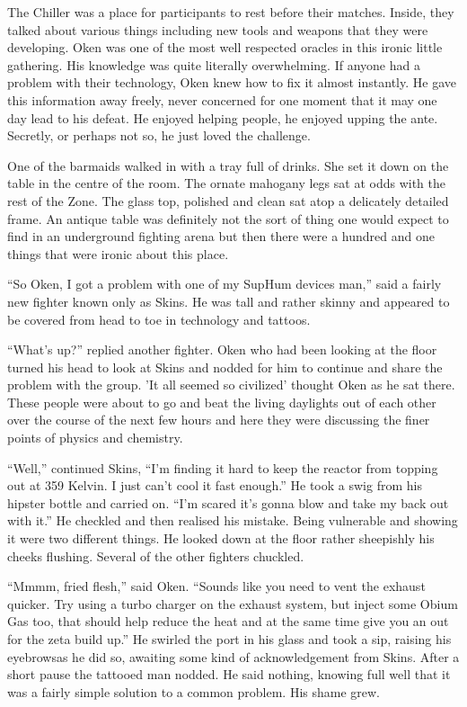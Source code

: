 The Chiller was a place for participants to rest before their matches. Inside, they talked about various things including new tools and weapons that they were developing. Oken was one of the most well respected oracles in this ironic little gathering. His knowledge was quite literally overwhelming. If anyone had a problem with their technology, Oken knew how to fix it almost instantly. He gave this information away freely, never concerned for one moment that it may one day lead to his defeat. He enjoyed helping people, he enjoyed upping the ante. Secretly, or perhaps not so, he just loved the challenge.

One of the barmaids walked in with a tray full of drinks. She set it down on the table in the centre of the room. The ornate mahogany legs sat at odds with the rest of the Zone. The glass top, polished and clean sat atop a delicately detailed frame. An antique table was definitely not the sort of thing one would expect to find in an underground fighting arena but then there were a hundred and one things that were ironic about this place.

``So Oken, I got a problem with one of my SupHum devices man,'' said a fairly new fighter known only as Skins. He was tall and rather skinny and appeared to be covered from head to toe in technology and tattoos.

``What's up?'' replied another fighter. Oken who had been looking at the floor turned his head to look at Skins and nodded for him to continue and share the problem with the group. 'It all seemed so civilized' thought Oken as he sat there. These people were about to go and beat the living daylights out of each other over the course of the next few hours and here they were discussing the finer points of physics and chemistry.

``Well,'' continued Skins, ``I'm finding it hard to keep the reactor from topping out at 359 Kelvin. I just can't cool it fast enough.'' He took a swig from his hipster bottle and carried on. ``I'm scared it's gonna blow and take my back out with it.'' He checkled and then realised his mistake. Being vulnerable and showing it were two different things. He looked down at the floor rather sheepishly his cheeks flushing. Several of the other fighters chuckled.

``Mmmm, fried flesh,'' said Oken. ``Sounds like you need to vent the exhaust quicker. Try using a turbo charger on the exhaust system, but inject some Obium Gas too, that should help reduce the heat and at the same time give you an out for the zeta build up.'' He swirled the port in his glass and took a sip, raising his eyebrowsas he did so, awaiting some kind of acknowledgement from Skins. After a short pause the tattooed man nodded. He said nothing, knowing full well that it was a fairly simple solution to a common problem. His shame grew.

